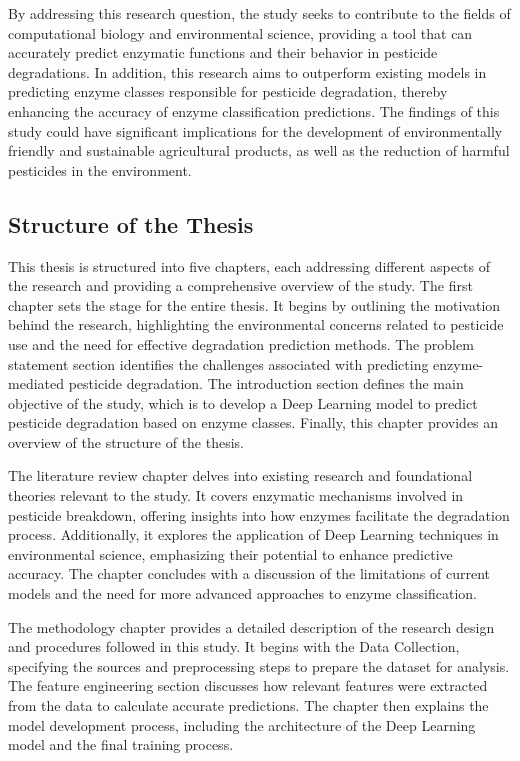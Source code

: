 By addressing this research question, the study seeks to contribute to the fields of computational biology and environmental science, providing a tool that can accurately predict enzymatic functions and their behavior in pesticide degradations. In addition, this research aims to outperform existing models in predicting enzyme classes responsible for pesticide degradation, thereby enhancing the accuracy of enzyme classification predictions. The findings of this study could have significant implications for the development of environmentally friendly and sustainable agricultural products, as well as the reduction of harmful pesticides in the environment.

\subsection{Structure of the Thesis}
\label{sec:Structure of the Thesis}
This thesis is structured into five chapters, each addressing different aspects of the research and providing a comprehensive overview of the study.
The first chapter sets the stage for the entire thesis. It begins by outlining the motivation behind the research, highlighting the environmental concerns related to pesticide use and the need for effective degradation prediction methods. The problem statement section identifies the challenges associated with predicting enzyme-mediated pesticide degradation. The introduction section defines the main objective of the study, which is to develop a Deep Learning model to predict pesticide degradation based on enzyme classes. Finally, this chapter provides an overview of the structure of the thesis.

The literature review chapter delves into existing research and foundational theories relevant to the study. It covers enzymatic mechanisms involved in pesticide breakdown, offering insights into how enzymes facilitate the degradation process. Additionally, it explores the application of Deep Learning techniques in environmental science, emphasizing their potential to enhance predictive accuracy. The chapter concludes with a discussion of the limitations of current models and the need for more advanced approaches to enzyme classification.

The methodology chapter provides a detailed description of the research design and procedures followed in this study. It begins with the Data Collection, specifying the sources and preprocessing steps to prepare the dataset for analysis. The feature engineering section discusses how relevant features were extracted from the data to calculate accurate predictions. The chapter then explains the model development process, including the architecture of the Deep Learning model and the final training process.


